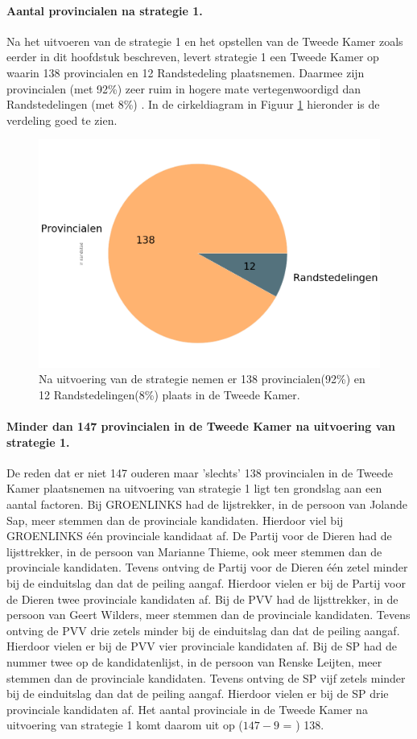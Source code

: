 \paragraph{Aantal provincialen na strategie 1.}
Na het uitvoeren van de strategie 1 en het opstellen van de Tweede Kamer zoals eerder in dit hoofdstuk beschreven, levert strategie 1 een Tweede Kamer op waarin  138 provincialen en 12 Randstedeling plaatsnemen. Daarmee zijn provincialen (met 92\%) zeer ruim in hogere mate vertegenwoordigd dan Randstedelingen (met 8\%) . In de cirkeldiagram in Figuur \ref{fig:pcS1P} hieronder is de verdeling goed te zien. 

\begin{figure}[H]
\centering
	\includegraphics[width=0.45\linewidth]{pie_chart_topN_provincialen.png}

			\caption{Na uitvoering van de strategie nemen er 138 provincialen(92\%) en 12 Randstedelingen(8\%) plaats in de Tweede Kamer.} 

\label{fig:pcS1P}
\end{figure}

\paragraph{Minder dan 147 provincialen in de Tweede Kamer na uitvoering van strategie 1.}
De reden dat er niet 147 ouderen maar 'slechts' 138 provincialen in de Tweede Kamer plaatsnemen na uitvoering van strategie 1 ligt ten grondslag aan een aantal factoren. Bij GROENLINKS had de lijstrekker, in de persoon van Jolande 
Sap, meer stemmen dan de provinciale kandidaten. Hierdoor viel bij GROENLINKS één provinciale kandidaat af. De Partij voor de Dieren had de lijsttrekker, in de persoon van Marianne Thieme, ook meer stemmen dan de provinciale kandidaten. Tevens ontving de Partij voor de Dieren één zetel minder bij de einduitslag dan dat de peiling aangaf. Hierdoor vielen er bij de Partij voor de Dieren twee provinciale kandidaten af. Bij de PVV had de lijsttrekker, in de persoon van Geert Wilders, meer stemmen dan de provinciale kandidaten. Tevens ontving de PVV drie zetels minder bij de einduitslag dan dat de peiling aangaf. Hierdoor vielen er bij de PVV vier provinciale kandidaten af. Bij de SP had de nummer twee op de kandidatenlijst, in de persoon van Renske Leijten, meer stemmen dan de provinciale kandidaten.  Tevens ontving de SP vijf zetels minder bij de einduitslag dan dat de peiling aangaf. Hierdoor vielen er bij de SP drie provinciale kandidaten af. Het aantal provinciale in de Tweede Kamer na uitvoering van strategie 1 komt daarom uit op ($147-9$ = ) 138.








